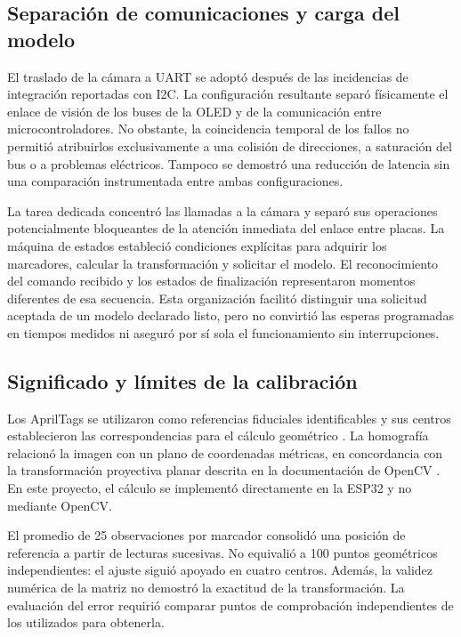 \subsection{Separación de comunicaciones y carga del modelo}

El traslado de la cámara a UART se adoptó después de las incidencias de integración reportadas con I2C. La configuración resultante separó físicamente el enlace de visión de los buses de la OLED y de la comunicación entre microcontroladores. No obstante, la coincidencia temporal de los fallos no permitió atribuirlos exclusivamente a una colisión de direcciones, a saturación del bus o a problemas eléctricos. Tampoco se demostró una reducción de latencia sin una comparación instrumentada entre ambas configuraciones.

La tarea dedicada concentró las llamadas a la cámara y separó sus operaciones potencialmente bloqueantes de la atención inmediata del enlace entre placas. La máquina de estados estableció condiciones explícitas para adquirir los marcadores, calcular la transformación y solicitar el modelo. El reconocimiento del comando recibido y los estados de finalización representaron momentos diferentes de esa secuencia. Esta organización facilitó distinguir una solicitud aceptada de un modelo declarado listo, pero no convirtió las esperas programadas en tiempos medidos ni aseguró por sí sola el funcionamiento sin interrupciones.

\subsection{Significado y límites de la calibración}

Los AprilTags se utilizaron como referencias fiduciales identificables y sus centros establecieron las correspondencias para el cálculo geométrico \cite{apriltag_fase5}. La homografía relacionó la imagen con un plano de coordenadas métricas, en concordancia con la transformación proyectiva planar descrita en la documentación de OpenCV \cite{opencv_homografia_fase5}. En este proyecto, el cálculo se implementó directamente en la ESP32 y no mediante OpenCV.

El promedio de 25 observaciones por marcador consolidó una posición de referencia a partir de lecturas sucesivas. No equivalió a 100 puntos geométricos independientes: el ajuste siguió apoyado en cuatro centros. Además, la validez numérica de la matriz no demostró la exactitud de la transformación. La evaluación del error requirió comparar puntos de comprobación independientes de los utilizados para obtenerla.

